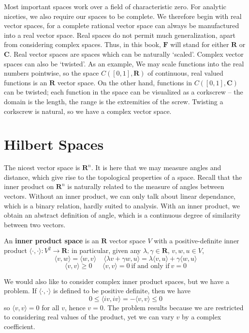 Most important spaces work over a field of characteristic zero. For analytic niceties, we also require our spaces to be complete. We therefore begin with real vector spaces, for a complete rational vector space can always be manufactured into a real vector space. Real spaces do not permit much generalization, apart from considering complex spaces. Thus, in this book, $\mathbf{F}$ will stand for either $\mathbf{R}$ or $\mathbf{C}$. Real vector spaces are spaces which can be naturally `scaled'. Complex vector spaces can also be `twisted'. As an example, We may scale functions into the real numbers pointwise, so the space $C([0,1], \mathbf{R})$ of continuous, real valued functions is an $\mathbf{R}$ vector space. On the other hand, functions in $C([0,1], \mathbf{C})$ can be twisted; each function in the space can be visualized as a corkscrew -- the domain is the length, the range is the extremities of the screw. Twisting a corkscrew is natural, so we have a complex vector space.

\chapter{Hilbert Spaces}

The nicest vector space is $\mathbf{R}^n$. It is here that we may measure angles and distance, which give rise to the topological properties of a space. Recall that the inner product on $\mathbf{R}^n$ is naturally related to the measure of angles between vectors. Without an inner product, we can only talk about linear dependance, which is a binary relation, hardly suited to analysis. With an inner product, we obtain an abstract definition of angle, which is a continuous degree of similarity between two vectors.

\begin{definition}
    An {\bf inner product space} is an $\mathbf{R}$ vector space $V$ with a positive-definite inner product $\langle \cdot, \cdot \rangle : V^2 \to \mathbf{R}$: in particular, given any $\lambda, \gamma \in \mathbf{R}$, $v,w, u \in V$,
    \[ \langle v, w \rangle = \langle w, v \rangle\ \ \ \ \ \langle \lambda v + \gamma w, u \rangle = \lambda \langle v, u \rangle + \gamma \langle w, u \rangle \]
    \[ \langle v, v \rangle \geq 0\ \ \ \ \ \ \ \langle v, v \rangle = 0\ \text{if and only if}\ v = 0 \]
\end{definition}

We would also like to consider complex inner product spaces, but we have a problem. If $\langle \cdot, \cdot \rangle$ is defined to be positive definite, then we have
%
\[ 0 \leq \langle i v, i v \rangle = - \langle v, v \rangle \leq 0 \]
%
so $\langle v, v \rangle = 0$ for all $v$, hence $v = 0$. The problem results because we are restricted to considering real values of the product, yet we can vary $v$ by a complex coefficient.

